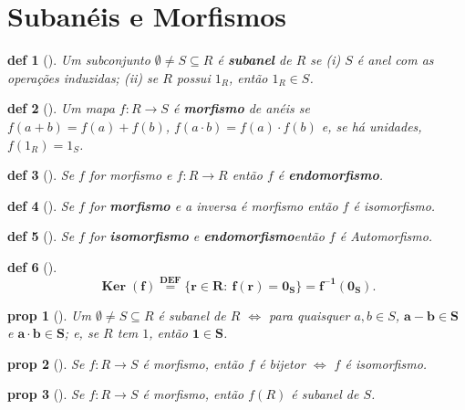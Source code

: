 \documentclass[11pt]{article}
\DeclareMathOperator{\Ker}{Ker}   %
\newcommand{\defname}[1]{\colorbox{yellow!30}{\strut \textbf{#1}}}
\newtheorem*{proposition}{prop}
\newtheorem*{definition}{def}
\theoremstyle{definition}
\begin{document}
\section{Subanéis e Morfismos}
\begin{multicols}{3}


\begin{definition}[\defname{Subanel}]
Um subconjunto \(\emptyset\neq S\subseteq R\) é \textbf{subanel} de \(R\) se (i) $S$ é anel com as operações induzidas; (ii) se $R$ possui $1_R$, então \(1_R\in S\).
\end{definition}

\begin{definition}[\defname{Morfismo (Homomorfismo) de Anéis}]
Um mapa \(f:R\to S\) é \textbf{morfismo} de anéis se
\(f(a+b)=f(a)+f(b)\),
\(f(a\cdot b)=f(a)\cdot f(b)\) e, se há unidades, \(f(1_R)=1_S\).
\end{definition}

\begin{definition}[\defname{Endomorfismo}]
Se $f$ for morfismo e \(f:R \to R\) então $f$ é \textbf{endomorfismo}. 
\end{definition}
\begin{definition}[\defname{Isomorfismo}]
Se $f$ for \textbf{morfismo} e a inversa é morfismo então $f$ é isomorfismo. 
\end{definition}
\begin{definition}[\defname{Automorfismo}]
Se $f$ for \textbf{isomorfismo} e \textbf{endomorfismo}então $f$ é Automorfismo. 
\end{definition}
\begin{definition}[\defname{Núcleo de um Morfismo}]
\[
\mathbf{\Ker(f)\stackrel{\text{DEF}}{=}\{r\in R:\ f(r)=0_S\}=f^{-1}(0_S)}.
\]
\end{definition}

\begin{proposition}[\defname{Caracterização de Subanel}]
Um \(\emptyset\neq S\subseteq R\) é subanel de \(R\) \(\iff\) para quaisquer \(a,b\in S\), \(\mathbf{a-b\in S}\) e \(\mathbf{a\cdot b\in S}\); e, se $R$ tem $1$, então \(\mathbf{1\in S}\).
\end{proposition}

\begin{proposition}[\defname{Morfismo Bijetor é Isomorfismo}]
Se \(f:R\to S\) é morfismo, então \(f\) é bijetor \(\iff\) \(f\) é isomorfismo.
\end{proposition}

\begin{proposition}[\defname{Imagem de anel é subanel}]
    Se \(f:R\to S\) é morfismo, então \(f(R)\) é subanel de $S$.
\end{proposition}

\end{multicols}
\end{document}
